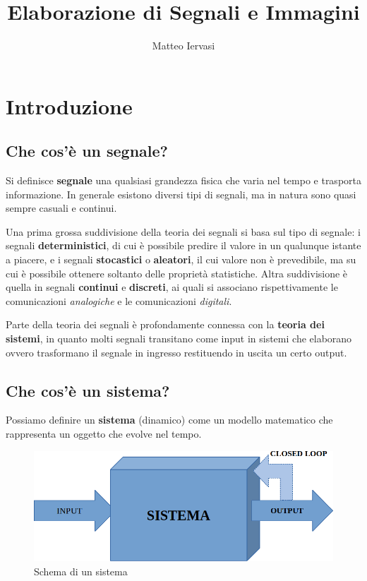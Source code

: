 \documentclass[a4paper, titlepage]{article}
\title{Elaborazione di Segnali e Immagini}
\author{Matteo Iervasi}
\date{ }
\begin{document}
\maketitle

\newpage
	\tableofcontents
\newpage

\section{Introduzione}
\subsection{Che cos'è un segnale?}
Si definisce \textbf{segnale} una qualsiasi grandezza fisica che varia nel tempo e trasporta informazione. 
In generale esistono diversi tipi di segnali, ma in natura sono quasi sempre casuali e continui.

Una prima grossa suddivisione della teoria dei segnali si basa sul tipo di segnale: i segnali \textbf{deterministici}, 
di cui è possibile predire il valore in un qualunque istante a piacere, e i segnali \textbf{stocastici} o \textbf{aleatori}, 
il cui valore non è prevedibile, ma su cui è possibile ottenere soltanto delle proprietà statistiche.
Altra suddivisione è quella in segnali \textbf{continui} e \textbf{discreti}, ai quali si associano rispettivamente le comunicazioni \textit{analogiche} e le comunicazioni \textit{digitali}.

Parte della teoria dei segnali è profondamente connessa con la \textbf{teoria dei sistemi}, in quanto molti segnali transitano come input 
in sistemi che elaborano ovvero trasformano il segnale in ingresso restituendo in uscita un certo output.

\subsection{Che cos'è un sistema?}
Possiamo definire un \textbf{sistema} (dinamico) come un modello matematico che rappresenta un oggetto che evolve nel tempo.
\begin{figure}[h]
	\centering
	\includegraphics[width=0.7\linewidth]{img/sistema}
	\caption[Schema di un sistema]{Schema di un sistema}
	\label{fig:sistema}
\end{figure}
\end{document}
